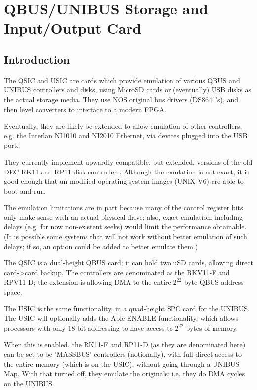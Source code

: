 %

\chapter{QBUS/UNIBUS Storage and Input/Output Card}
\section{Introduction}

The QSIC and USIC are cards which provide emulation of various QBUS and
UNIBUS controllers and disks, using MicroSD cards or (eventually) USB disks
as the actual storage media. They use NOS original bus drivers (DS8641's),
and then level converters to interface to a modern FPGA.

Eventually, they are likely be extended to allow emulation of other
controllers, e.g. the Interlan NI1010 and NI2010 Ethernet, via devices
plugged into the USB port.

They currently implement upwardly compatible, but extended, versions of the
old DEC RK11 and RP11 disk controllers. Although the emulation is not exact,
it is good enough that un-modified operating system images (UNIX V6) are able
to boot and run.

The emulation limitations are in part because many of the control register
bits only make sense with an actual physical drive; also, exact emulation,
including delays (e.g. for now non-existent seeks) would limit the
performance obtainable. (It is possible some systems that will not work
without better emulation of such delays; if so, an option could be added to
better emulate them.)

The QSIC is a dual-height QBUS card; it can hold two uSD cards, allowing
direct card->card backup. The controllers are denominated as the RKV11-F and
RPV11-D; the extension is allowing DMA to the entire $2^{22}$ byte QBUS
address space.

The USIC is the same functionality, in a quad-height SPC card for the UNIBUS.
The USIC will optionally adds the Able ENABLE functionality, which allows
processors with only 18-bit addressing to have access to $2^{22}$ bytes of
memory.

When this is enabled, the RK11-F and RP11-D (as they are denominated here)
can be set to be 'MASSBUS' controllers (notionally), with full direct access
to the entire memory (which is on the USIC), without going through a UNIBUS
Map. With that turned off, they emulate the originals; i.e. they do DMA
cycles on the UNIBUS.

